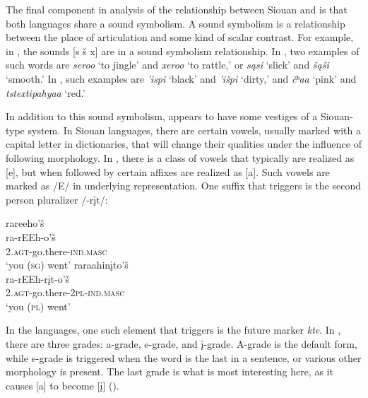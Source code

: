 \documentclass[output=paper]{LSP/langsci}
\begin{document}
The final component in  analysis of the relationship between Siouan and  is that both languages share a  sound symbolism. A sound symbolism is a relationship between the place of articulation and some kind of scalar contrast. For example, in , the sounds [s \v{s} x] are in a sound symbolism relationship. In , two examples of such words are \emph{seroo} `to jingle' and \emph{xeroo} `to rattle,' or \emph{s\k{a}si} `slick' and \emph{\v{s}\k{a}\v{s}i} `smooth.' In , such examples are \emph{'ispi} `black' and \emph{'i\v{s}pi} `dirty,' and \emph{\v{c}ʰa\textbeltl a} `pink' and \emph{tstextipa{\super h}ya\textbeltl a} `red.'

In addition to this sound symbolism,  appears to have some vestiges of a Siouan-type  system. In Siouan languages, there are certain vowels, usually marked with a capital letter in dictionaries, that will change their qualities under the influence of following morphology. In , there is a class of vowels that typically are realized as [e], but when followed by certain affixes are realized as [a]. Such vowels are marked as /E/ in underlying representation. One suffix that triggers  is the second person pluralizer /-r\k{i}t/:

\ea
	\ea 
	\glll rareeho'\v{s} \\
	ra-rEEh-o'\v{s} \\	
	\textsc{2.agt}-go.there-\textsc{ind.masc} \\
	\glt	`you (\textsc{sg}) went'
	\ex 
	\glll raraahin\k{i}to'\v{s}\\
	ra-rEEh-r\k{i}t-o'\v{s}\\	
	\textsc{2.agt}-go.there-\textsc{2pl-ind.masc}\\
	\glt	`you (\textsc{pl}) went'
	\z
\z

In the  languages, one such element that triggers  is the future marker \emph{kte}. In , there are three  grades: a-grade, e-grade, and \k{i}-grade. A-grade is the default form, while e-grade is triggered when the word is the last in a sentence, or various other morphology is present. The last grade is what is most interesting here, as it causes [a] to become [\k{i}] (\citealt{Ullrich2008}).
\end{document}
